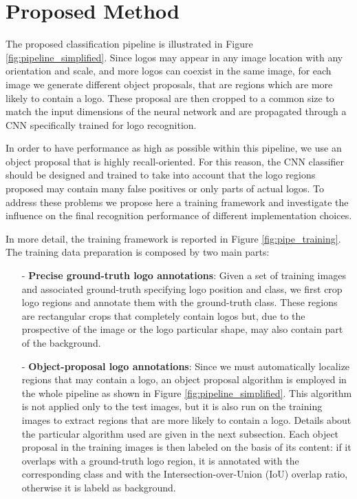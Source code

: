 \documentclass[final,5p,twocolumn]{elsarticle}
\begin{document}
\section{Proposed Method}
\label{sec:proposedmethod}
The proposed classification pipeline is illustrated in Figure \ref{fig:pipeline_simplified}.
Since logos may appear in any image location with any orientation and scale, and more logos can coexist in the same image, for each image we generate different object proposals, that are regions which are more likely to contain a logo.
These proposal are then cropped to a common size to match the input dimensions of the neural network and are propagated through a CNN specifically trained for logo recognition.


In order to have performance as high as possible within this pipeline, we use an object proposal that is highly recall-oriented.  For this reason, the CNN classifier should be designed and trained to take into account that the logo regions proposed may contain many false positives or only parts of actual logos. To address these problems we propose here a training framework and investigate the influence on the final recognition performance of different implementation choices.

In more detail, the
training framework is reported in Figure \ref{fig:pipe_training}. The training data preparation is composed by two main parts:
\begin{itemize}
\item[-] {\bf Precise ground-truth logo annotations}: Given a set of training images and associated ground-truth specifying logo position and class, we first crop logo regions and annotate them with the ground-truth class. These regions are rectangular crops that completely contain logos but, due to the prospective of the image or the logo particular shape, may also contain part of the background.\item[-] {\bf Object-proposal logo annotations}: Since we must automatically localize regions that may contain a logo, an object proposal algorithm is employed in the whole pipeline as shown in Figure \ref{fig:pipeline_simplified}. This algorithm is not applied only to the test images, but it is also run on the training images to extract regions that are more likely to contain a logo. Details about the particular algorithm used are given in the next subsection.
Each object proposal in the training images is then labeled on the basis of its content: if it overlaps with a ground-truth logo region, it is annotated with the corresponding class and with the Intersection-over-Union (IoU) overlap ratio, otherwise it is labeld as background.\end{itemize}
\end{document}
